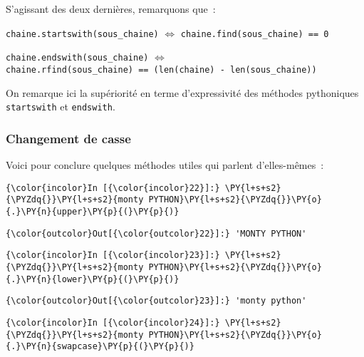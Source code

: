     S'agissant des deux dernières, remarquons que~:

    \texttt{chaine.startswith(sous\_chaine)} \(\Longleftrightarrow\)
\texttt{chaine.find(sous\_chaine)\ ==\ 0}

\texttt{chaine.endswith(sous\_chaine)} \(\Longleftrightarrow\)
\texttt{chaine.rfind(sous\_chaine)\ ==\ (len(chaine)\ -\ len(sous\_chaine))}

    On remarque ici la supériorité en terme d'expressivité des méthodes
pythoniques \texttt{startswith} et \texttt{endswith}.

    \hypertarget{changement-de-casse}{%
\subsubsection{Changement de casse}\label{changement-de-casse}}

    Voici pour conclure quelques méthodes utiles qui parlent d'elles-mêmes~:

    \begin{Verbatim}[commandchars=\\\{\}]
{\color{incolor}In [{\color{incolor}22}]:} \PY{l+s+s2}{\PYZdq{}}\PY{l+s+s2}{monty PYTHON}\PY{l+s+s2}{\PYZdq{}}\PY{o}{.}\PY{n}{upper}\PY{p}{(}\PY{p}{)}
\end{Verbatim}


\begin{Verbatim}[commandchars=\\\{\}]
{\color{outcolor}Out[{\color{outcolor}22}]:} 'MONTY PYTHON'
\end{Verbatim}
            
    \begin{Verbatim}[commandchars=\\\{\}]
{\color{incolor}In [{\color{incolor}23}]:} \PY{l+s+s2}{\PYZdq{}}\PY{l+s+s2}{monty PYTHON}\PY{l+s+s2}{\PYZdq{}}\PY{o}{.}\PY{n}{lower}\PY{p}{(}\PY{p}{)}
\end{Verbatim}


\begin{Verbatim}[commandchars=\\\{\}]
{\color{outcolor}Out[{\color{outcolor}23}]:} 'monty python'
\end{Verbatim}
            
    \begin{Verbatim}[commandchars=\\\{\}]
{\color{incolor}In [{\color{incolor}24}]:} \PY{l+s+s2}{\PYZdq{}}\PY{l+s+s2}{monty PYTHON}\PY{l+s+s2}{\PYZdq{}}\PY{o}{.}\PY{n}{swapcase}\PY{p}{(}\PY{p}{)}
\end{Verbatim}


